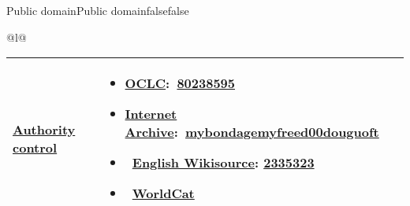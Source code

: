 {Public domain}{Public domain}{false}{false}

\begin{longtable}[]{@{}l@{}}
\toprule
\begin{minipage}[t]{0.97\columnwidth}\raggedright\strut
\begin{longtable}[]{@{}ll@{}}
\toprule
\begin{minipage}[t]{0.48\columnwidth}\raggedright\strut
\href{/wiki/Wikisource:Authority_control}{Authority control}\strut
\end{minipage} & \begin{minipage}[t]{0.48\columnwidth}\raggedright\strut
\begin{itemize}
\tightlist
\item
  \href{https://en.wikipedia.org/wiki/OCLC}{OCLC}:~{\href{http://www.worldcat.org/oclc/80238595?lang=en}{80238595}}
\item
  \href{https://en.wikipedia.org/wiki/Internet_Archive}{Internet
  Archive}:~{\href{http://www.archive.org/details/mybondagemyfreed00douguoft}{mybondagemyfreed00douguoft}}
\item
  ~{\href{/wiki/Wikisource:Authority_control}{English Wikisource}:
  \href{//en.wikisource.org/w/index.php?curid=2335323}{2335323}}
\item
  ~{\href{http://www.worldcat.org/oclc/80238595}{WorldCat}}
\end{itemize}\strut
\end{minipage}\tabularnewline
\bottomrule
\end{longtable}\strut
\end{minipage}\tabularnewline
\bottomrule
\end{longtable}
